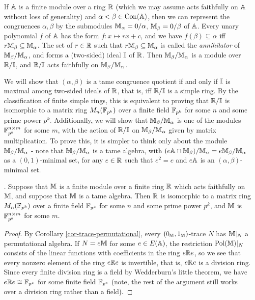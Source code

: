 \begin{appendices}
\begin{ex} If $\mathbb{A}$ is a finite module over a ring $\mathbb{R}$ (which we may assume acts faithfully on $\mathbb{A}$ without loss of generality) and $\alpha < \beta \in \operatorname{Con}(\mathbb{A})$, then we can represent the congruences $\alpha,\beta$ by the submodules $\mathbb{M}_\alpha = 0/\alpha$, $\mathbb{M}_\beta = 0/\beta$ of $\mathbb{A}$. Every unary polynomial $f$ of $\mathbb{A}$ has the form $f : x \mapsto rx + c$, and we have $f(\beta) \subseteq \alpha$ iff $r\mathbb{M}_\beta \subseteq \mathbb{M}_\alpha$. The set of $r \in \mathbb{R}$ such that $r \mathbb{M}_\beta \subseteq \mathbb{M}_\alpha$ is called the \emph{annihilator} of $\mathbb{M}_\beta/\mathbb{M}_\alpha$, and forms a (two-sided) ideal $\mathbb{I}$ of $\mathbb{R}$. Then $\mathbb{M}_\beta/\mathbb{M}_\alpha$ is a module over $\mathbb{R}/\mathbb{I}$, and $\mathbb{R}/\mathbb{I}$ acts faithfully on $\mathbb{M}_\beta/\mathbb{M}_\alpha$.

We will show that $(\alpha,\beta)$ is a tame congruence quotient if and only if $\mathbb{I}$ is maximal among two-sided ideals of $\mathbb{R}$, that is, iff $\mathbb{R}/\mathbb{I}$ is a simple ring. By the classification of finite simple rings, this is equivalent to proving that $\mathbb{R}/\mathbb{I}$ is isomorphic to a matrix ring $M_n(\mathbb{F}_{p^k})$ over a finite field $\mathbb{F}_{p^k}$ for some $n$ and some prime power $p^k$. Additionally, we will show that $\mathbb{M}_\beta/\mathbb{M}_\alpha$ is one of the modules $\mathbb{F}_{p^k}^{n\times m}$ for some $m$, with the action of $\mathbb{R}/\mathbb{I}$ on $\mathbb{M}_\beta/\mathbb{M}_\alpha$ given by matrix multiplication. To prove this, it is simpler to think only about the module $\mathbb{M}_\beta/\mathbb{M}_\alpha$ - note that $\mathbb{M}_\beta/\mathbb{M}_\alpha$ is a tame algebra, with $(e\mathbb{A}\cap \mathbb{M}_\beta)/\mathbb{M}_\alpha = e\mathbb{M}_\beta/\mathbb{M}_\alpha$ as a $(0,1)$-minimal set, for any $e \in \mathbb{R}$ such that $e^2 = e$ and $e\mathbb{A}$ is an $(\alpha,\beta)$-minimal set.
\end{ex}

\begin{prop}. Suppose that $\mathbb{M}$ is a finite module over a finite ring $\mathbb{R}$ which acts faithfully on $\mathbb{M}$, and suppose that $\mathbb{M}$ is a tame algebra. Then $\mathbb{R}$ is isomorphic to a matrix ring $M_n(\mathbb{F}_{p^k})$ over a finite field $\mathbb{F}_{p^k}$ for some $n$ and some prime power $p^k$, and $\mathbb{M}$ is $\mathbb{F}_{p^k}^{n\times m}$ for some $m$.
\end{prop}
\begin{proof}
By Corollary \ref{cor-trace-permutational}, every $(0_{\mathbb{M}},1_{\mathbb{M}})$-trace $N$ has $\mathbb{M}|_N$ a permutational algebra. If $N = e\mathbb{M}$ for some $e \in E(\mathbb{A})$, the restriction $\operatorname{Pol}(\mathbb{M})|_N$ consists of the linear functions with coefficients in the ring $e\mathbb{R} e$, so we see that every nonzero element of the ring $e\mathbb{R} e$ is invertible, that is, $e\mathbb{R} e$ is a division ring. Since every finite division ring is a field by Wedderburn's little theorem, we have $e \mathbb{R} e \cong \mathbb{F}_{p^k}$ for some finite field $\mathbb{F}_{p^k}$ (note, the rest of the argument still works over a division ring rather than a field).


\end{proof}
\end{appendices}
